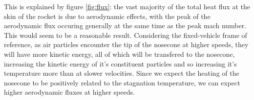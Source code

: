 \documentclass[twocolumn]{article}
\begin{document}
            This is explained by figure \ref{fig:flux}: the vast majority of the 
            total heat flux at the skin of the rocket is due to aerodynamic
            effects, with the peak of the aerodynamic flux occuring generally at 
            the same time as the peak mach number. This would seem to be a
            reasonable result. Considering the fixed-vehicle frame of reference,
            as air particles encounter the tip of the nosecone at higher speeds, 
            they will have more kinetic energy, all of which will be transfered 
            to the nosecone, increasing the kinetic energy of it's constituent 
            particles and so increasing it's temperature more than at slower
            velocities. Since we expect the heating of the nosecone to be 
            positively related to the stagnation temperature, we can expect
            higher aerodynamic fluxes at higher speeds. 
            




            
\end{document}
